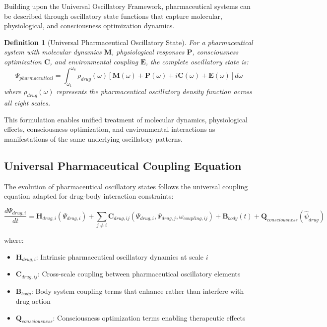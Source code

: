\documentclass[12pt,a4paper]{article}
\newtheorem{definition}{Definition}
\begin{document}
Building upon the Universal Oscillatory Framework, pharmaceutical systems can be described through oscillatory state functions that capture molecular, physiological, and consciousness optimization dynamics.

\begin{definition}[Universal Pharmaceutical Oscillatory State]
For a pharmaceutical system with molecular dynamics $\mathbf{M}$, physiological responses $\mathbf{P}$, consciousness optimization $\mathbf{C}$, and environmental coupling $\mathbf{E}$, the complete oscillatory state is:
\begin{equation}
\Psi_{pharmaceutical} = \int_{\omega_1}^{\omega_8} \rho_{drug}(\omega) [\mathbf{M}(\omega) + \mathbf{P}(\omega) + i\mathbf{C}(\omega) + \mathbf{E}(\omega)] d\omega
\end{equation}
where $\rho_{drug}(\omega)$ represents the pharmaceutical oscillatory density function across all eight scales.
\end{definition}

This formulation enables unified treatment of molecular dynamics, physiological effects, consciousness optimization, and environmental interactions as manifestations of the same underlying oscillatory patterns.

\subsection{Universal Pharmaceutical Coupling Equation}

The evolution of pharmaceutical oscillatory states follows the universal coupling equation adapted for drug-body interaction constraints:

\begin{equation}
\frac{d\Psi_{drug,i}}{dt} = \mathbf{H}_{drug,i}(\Psi_{drug,i}) + \sum_{j \neq i} \mathbf{C}_{drug,ij}(\Psi_{drug,i}, \Psi_{drug,j}, \omega_{coupling,ij}) + \mathbf{B}_{body}(t) + \mathbf{Q}_{consciousness}(\hat{\psi}_{drug})
\end{equation}

where:
\begin{itemize}
\item $\mathbf{H}_{drug,i}$: Intrinsic pharmaceutical oscillatory dynamics at scale $i$
\item $\mathbf{C}_{drug,ij}$: Cross-scale coupling between pharmaceutical oscillatory elements
\item $\mathbf{B}_{body}$: Body system coupling terms that enhance rather than interfere with drug action
\item $\mathbf{Q}_{consciousness}$: Consciousness optimization terms enabling therapeutic effects
\end{itemize}
\end{document}

